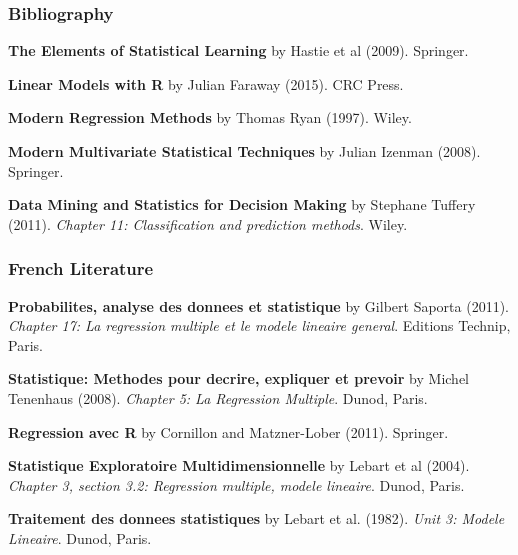 \documentclass[12pt]{beamer}\usepackage[]{graphicx}\usepackage[]{color}
\begin{document}
\begin{frame}
\frametitle{Bibliography}

{\footnotesize
\bi
  \item \textbf{The Elements of Statistical Learning} by Hastie et al (2009). Springer.
  \item \textbf{Linear Models with R} by Julian Faraway (2015). CRC Press.
  \item \textbf{Modern Regression Methods} by Thomas Ryan (1997). Wiley.
  \item \textbf{Modern Multivariate Statistical Techniques} by Julian Izenman (2008). Springer.
  \item \textbf{Data Mining and Statistics for Decision Making} by Stephane Tuffery (2011).
  \textit{Chapter 11: Classification and prediction methods}. Wiley.
\ei
}

\end{frame}


\begin{frame}
\frametitle{French Literature}

{\footnotesize
\bi
  \item \textbf{Probabilites, analyse des donnees et statistique} by Gilbert Saporta (2011).
  \textit{Chapter 17: La regression multiple et le modele lineaire general}. 
  Editions Technip, Paris.
  \item \textbf{Statistique: Methodes pour decrire, expliquer et prevoir} 
  by Michel Tenenhaus (2008). \textit{Chapter 5: La Regression Multiple}. Dunod, Paris.
  \item \textbf{Regression avec R} by Cornillon and Matzner-Lober (2011). Springer.
  \item \textbf{Statistique Exploratoire Multidimensionnelle} by Lebart et al (2004).
  \textit{Chapter 3, section 3.2: Regression multiple, modele lineaire}. Dunod, Paris.
  \item \textbf{Traitement des donnees statistiques} by Lebart et al. (1982). 
  \textit{Unit 3: Modele Lineaire}. Dunod, Paris.
\ei
}

\end{frame}

\end{document}
